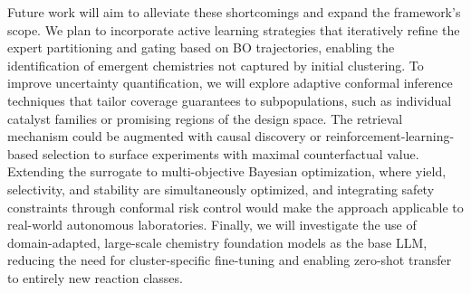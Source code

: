 \documentclass{article}
\begin{document}
Future work will aim to alleviate these shortcomings and expand the framework’s scope. We plan to incorporate active learning strategies that iteratively refine the expert partitioning and gating based on BO trajectories, enabling the identification of emergent chemistries not captured by initial clustering. To improve uncertainty quantification, we will explore adaptive conformal inference techniques that tailor coverage guarantees to subpopulations, such as individual catalyst families or promising regions of the design space. The retrieval mechanism could be augmented with causal discovery or reinforcement-learning-based selection to surface experiments with maximal counterfactual value. Extending the surrogate to multi-objective Bayesian optimization, where yield, selectivity, and stability are simultaneously optimized, and integrating safety constraints through conformal risk control would make the approach applicable to real-world autonomous laboratories. Finally, we will investigate the use of domain-adapted, large-scale chemistry foundation models as the base LLM, reducing the need for cluster-specific fine-tuning and enabling zero-shot transfer to entirely new reaction classes.



\end{document}
